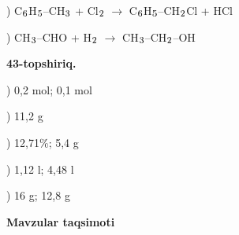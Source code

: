 \documentclass[11pt,a4paper]{article}
\renewcommand{\textsubscript}[1]{\ensuremath{_{\text{\fontsize{8}{8}\selectfont #1}}}}
\begin{document}
) C\textsubscript{6}H\textsubscript{5}--CH\textsubscript{3} + Cl\textsubscript{2} $\to$ C\textsubscript{6}H\textsubscript{5}--CH\textsubscript{2}Cl + HCl\par
{}) CH\textsubscript{3}--CHO + H\textsubscript{2} $\to$ CH\textsubscript{3}--CH\textsubscript{2}--OH\par
\noindent\textbf{43-topshiriq.}\par
{}) 0,2 mol; 0,1 mol\par
{}) 11,2 g\par
{}) 12,71\%; 5,4 g\par
{}) 1,12 l; 4,48 l\par
{}) 16 g; 12,8 g\par
\par\bigskip\noindent\textbf{Mavzular taqsimoti}\par\smallskip
\end{document}
